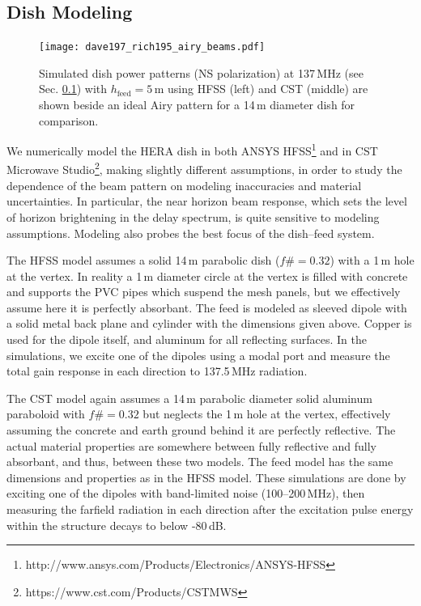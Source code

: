\documentclass{emulateapj}
\begin{document}
\subsection{Dish Modeling}
\label{sec:dishmodels}

\begin{figure}
\centering
\texttt{[image: dave197\_rich195\_airy\_beams.pdf]}
\caption{Simulated dish power patterns (NS polarization) at 137\,MHz (see Sec. \ref{sec:dishmodels}) with $h_\text{feed}=5$\,m using HFSS (left) and CST (middle) are shown beside an ideal Airy pattern for a 14\,m diameter dish for comparison.}
\label{fig:modelbeams}
\end{figure}

We numerically model the HERA dish in both ANSYS HFSS\footnote{http://www.ansys.com/Products/Electronics/ANSYS-HFSS} and in CST Microwave Studio\footnote{https://www.cst.com/Products/CSTMWS}, making slightly different assumptions, in order to study the dependence of the beam pattern on modeling inaccuracies and material uncertainties. In particular, the near horizon beam response, which sets the level of horizon brightening in the delay spectrum, is quite sensitive to modeling assumptions. Modeling also probes the best focus of the dish--feed system. 

The HFSS model assumes a solid 14\,m parabolic dish ($f\#=0.32$) with a 1\,m hole at the vertex. In reality a 1\,m diameter circle at the vertex is filled with concrete and supports the PVC pipes which suspend the mesh panels, but we effectively assume here it is perfectly absorbant.  The feed is modeled as sleeved dipole with a solid metal back plane and cylinder with the dimensions given above. Copper is used for the dipole itself, and aluminum for all reflecting surfaces. In the simulations, we excite one of the dipoles using a modal port and measure the total gain response in each direction to 137.5\,MHz radiation. 

The CST model again assumes a 14\,m parabolic diameter solid aluminum paraboloid with $f\#=0.32$ but neglects the 1\,m hole at the vertex, effectively assuming the concrete and earth ground behind it are perfectly reflective. The actual material properties are somewhere between fully reflective and fully absorbant, and thus, between these two models. The feed model has the same dimensions and properties as in the HFSS model. These simulations are done by exciting one of the dipoles with band-limited noise (100--200\,MHz), then measuring the farfield radiation in each direction after the excitation pulse energy within the structure decays to below -80\,dB. 
\end{document}
